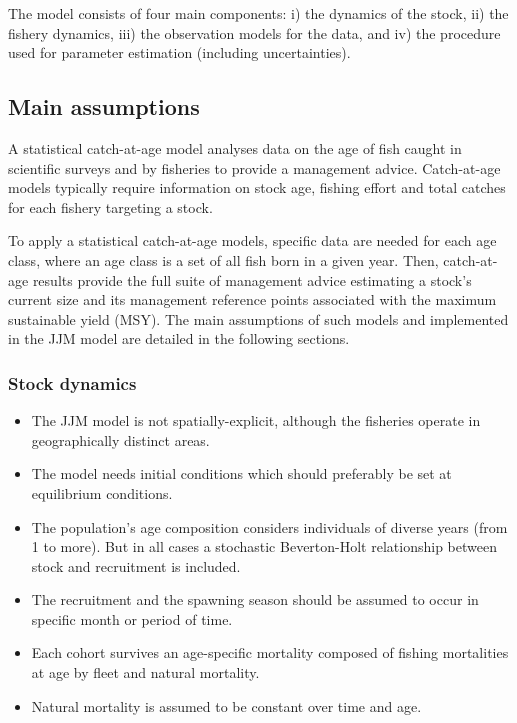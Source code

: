 \documentclass{article}
\begin{document}
The model consists of four main components: i) the dynamics of the stock, ii) the fishery dynamics, iii) the observation models for the data, and iv) the procedure used for parameter estimation (including uncertainties).

\subsection{Main assumptions}

A statistical catch-at-age model analyses data on the age of fish caught in scientific surveys and by fisheries to provide a management advice. Catch-at-age models typically require information on stock age, fishing effort and total catches for each fishery targeting a stock.

To apply a statistical catch-at-age models, specific data are needed for each age class, where an age class is a set of all fish born in a given year. Then, catch-at-age results provide the full suite of management advice estimating a stock's current size and its management reference points associated with the maximum sustainable yield (MSY). The main assumptions of such models and implemented in the JJM model are detailed in the following sections.

\subsubsection{Stock dynamics}

\begin{itemize}

\item The JJM model is not spatially-explicit, although the fisheries operate in geographically distinct areas.

\item The model needs initial conditions which should preferably be set at equilibrium conditions.

\item The population's age composition considers individuals of diverse years (from 1 to more). But in all cases a stochastic Beverton-Holt relationship between stock and recruitment is included.

\item The recruitment and the spawning season should be assumed to occur in specific month or period of time.


\item Each cohort survives an age-specific mortality composed of fishing mortalities at age by fleet and natural mortality.

\item Natural mortality is assumed to be constant over time and age.

\end{itemize}
\end{document}

